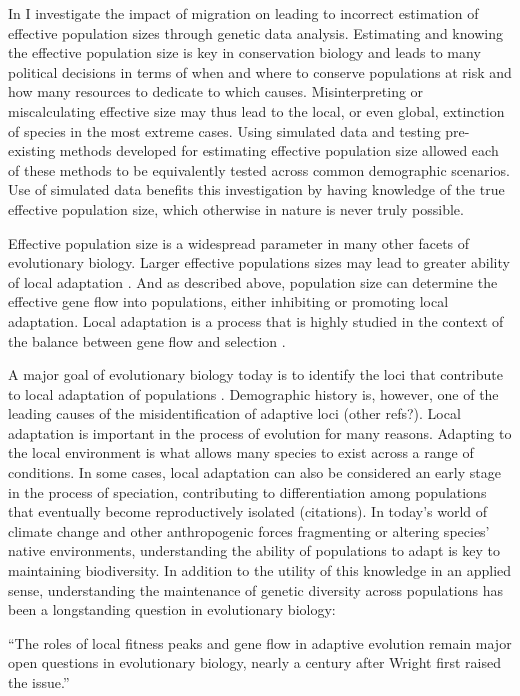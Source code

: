 In  I investigate the impact of migration on leading to incorrect estimation of effective population sizes through genetic data analysis. Estimating and knowing the effective population size is key in conservation biology and leads to many political decisions in terms of when and where to conserve populations at risk and how many resources to dedicate to which causes. Misinterpreting or miscalculating effective size may thus lead to the local, or even global, extinction of species in the most extreme cases. Using simulated data and testing pre-existing methods developed for estimating effective population size allowed each of these methods to be equivalently tested across common demographic scenarios. Use of simulated data benefits this investigation by having knowledge of the true effective population size, which otherwise in nature is never truly possible.

Effective population size is a widespread parameter in many other facets of evolutionary biology. Larger effective populations sizes may lead to greater ability of local adaptation \citep{Leimu:2008}. And as described above, population size can determine the effective gene flow into populations, either inhibiting or promoting local adaptation. Local adaptation is a process that is highly studied in the context of the balance between gene flow and selection \citep{Kawecki:2004}.

A major goal of evolutionary biology today is to identify the loci that contribute to local adaptation of populations \citep{Savolainen:2013, Whitlock:2015, LeCorre:2012, Coop:2010}. Demographic history is, however, one of the leading causes of the misidentification of adaptive loci \citep{Whitlock:2015}(\color{red}other refs?\color{black}). Local adaptation is important in the process of evolution for many reasons. Adapting to the local environment is what allows many species to exist across a range of conditions. In some cases, local adaptation can also be considered an early stage in the process of speciation, contributing to differentiation among populations that eventually become reproductively isolated (\color{red}citations\color{black}). In today's world of climate change and other anthropogenic forces fragmenting or altering species' native environments, understanding the ability of populations to adapt is key to maintaining biodiversity. In addition to the utility of this knowledge in an applied sense, understanding the maintenance of genetic diversity across populations has been a longstanding question in evolutionary biology:
\begin{quoteshrink}
  ``The roles of local fitness peaks and gene flow in adaptive evolution remain major open questions in evolutionary biology, nearly a century after Wright first raised the issue.''
  \hfill\citet{Barton:2016}
\end{quoteshrink}

